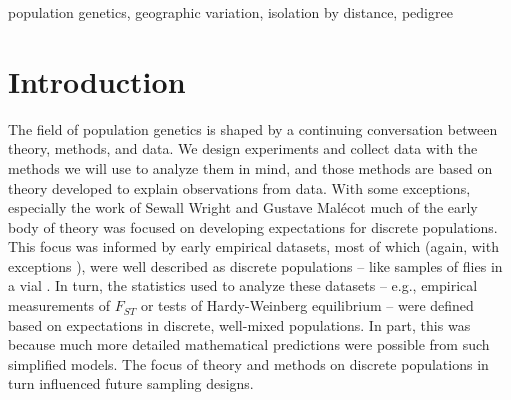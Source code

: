 \documentclass{ar-1col}
\begin{document}
\ifsubmissionversion
\begin{keywords}
population genetics, geographic variation, isolation by distance, pedigree
\end{keywords}
\maketitle
\else
\newpage
\fi

\tableofcontents

\ifsubmissionversion
\else
	\newpage
\fi

\section{Introduction}

The field of population genetics is shaped by a continuing conversation
between theory, methods, and data.
We design experiments and collect data
with the methods we will use to analyze them in mind, 
and those methods are based on theory
developed to explain observations from data.
With some exceptions,
especially the work of Sewall Wright \citep{Wright1940,Wright1943,wright1946isolation}
and Gustave Mal\'ecot \citep{malecot}
much of the early body of theory was focused on
developing expectations for discrete populations.
This focus was informed by early empirical datasets,
most of which
(again, with exceptions \citep[e.g.,][]{Dobzhansky_Wright1943, dobzhansky1947}),
were well described as discrete populations --
like samples of flies in a vial \citep{lewontin1974}.
In turn, 
the statistics used to analyze these datasets --
e.g., empirical measurements of $F_{ST}$ \citep{Wright1951}
or tests of Hardy-Weinberg equilibrium \citep{hardy1908,weinberg1908} --
were defined based on expectations in discrete, well-mixed populations.
In part, this was because much more detailed mathematical predictions 
were possible from such simplified models.
The focus of theory and methods on discrete populations in turn influenced
future sampling designs.
\end{document}
